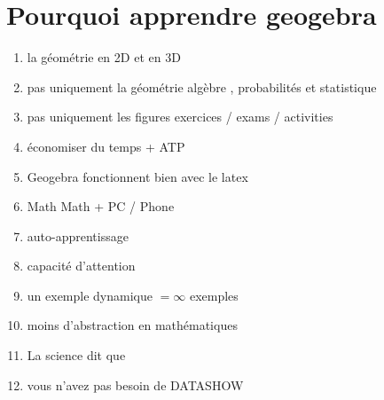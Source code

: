 \documentclass[allowframebreaks,aspectratio=169]{beamer}
\begin{document}
%



\section{Pourquoi apprendre geogebra}
  	\begin{frame}
	\begin{center}
	\end{center}
	
	\begin{enumerate}
			\item la géométrie en 2D \pause  et en 3D \pause
		
		\item pas uniquement la géométrie \pause algèbre , probabilités et statistique
				\item pas uniquement les figures \pause exercices / exams / activities
		\pause
				\item économiser du temps + ATP \pause
		\item Geogebra  fonctionnent bien avec le latex
				\pause
				
		\item Math    \quad\quad\quad \pause Math + PC / Phone  
		\pause
		
		\item auto-apprentissage 
				\pause
						\item  capacité d'attention
				\pause
		\item un exemple dynamique $= \infty $ exemples
			\pause
		\item moins d'abstraction en mathématiques \pause
		\item La science dit que
\pause
		\item vous n'avez pas besoin de DATASHOW
	\end{enumerate}
\end{frame}
%
\end{document}
